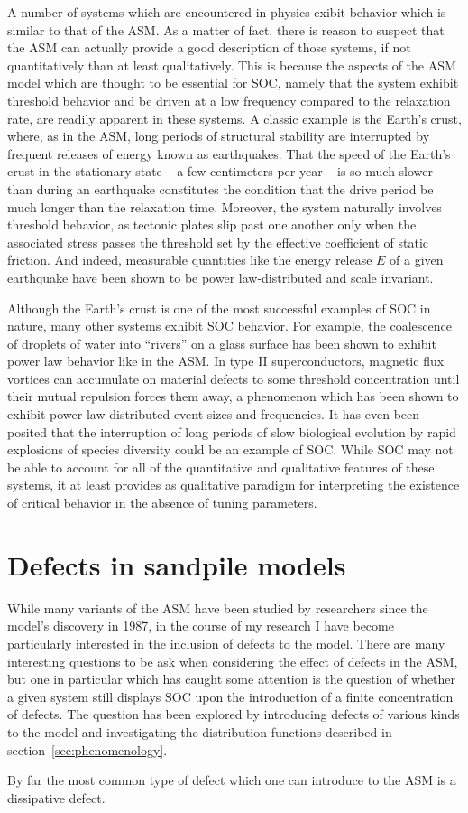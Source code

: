 \documentclass[aps,prb,reprint,superscriptaddress]{revtex4-2}
\begin{document}
A number of systems which are encountered in physics exibit behavior which is similar to that of the ASM. As a matter of fact, there is reason to suspect that the ASM can actually provide a good description of those systems, if not quantitatively than at least qualitatively. This is because the aspects of the ASM model which are thought to be essential for SOC, namely that the system exhibit threshold behavior and be driven at a low frequency compared to the relaxation rate, are readily apparent in these systems. A classic example is the Earth's crust, where, as in the ASM, long periods of structural stability are interrupted by frequent releases of energy known as earthquakes. That the speed of the Earth's crust in the stationary state -- a few centimeters per year -- is so much slower than during an earthquake constitutes the condition that the drive period be much longer than the relaxation time. Moreover, the system naturally involves threshold behavior, as tectonic plates slip past one another only when the associated stress passes the threshold set by the effective coefficient of static friction. And indeed, measurable quantities like the energy release $E$ of a given earthquake have been shown to be power law-distributed and scale invariant.

Although the Earth's crust is one of the most successful examples of SOC in nature, many other systems exhibit SOC behavior. For example, the coalescence of droplets of water into ``rivers'' on a glass surface has been shown to exhibit power law behavior like in the ASM. In type II superconductors, magnetic flux vortices can accumulate on material defects to some threshold concentration until their mutual repulsion forces them away, a phenomenon which has been shown to exhibit power law-distributed event sizes and frequencies. It has even been posited that the interruption of long periods of slow biological evolution by rapid explosions of species diversity could be an example of SOC. While SOC may not be able to account for all of the quantitative and qualitative features of these systems, it at least provides as qualitative paradigm for interpreting the existence of critical behavior in the absence of tuning parameters.

\section{Defects in sandpile models}

While many variants of the ASM have been studied by researchers since the model's discovery in 1987, in the course of my research I have become particularly interested in the inclusion of defects to the model. There are many interesting questions to be ask when considering the effect of defects in the ASM, but one in particular which has caught some attention is the question of whether a given system still displays SOC upon the introduction of a finite concentration of defects. The question has been explored by introducing defects of various kinds to the model and investigating the distribution functions described in section~\ref{sec:phenomenology}.

By far the most common type of defect which one can introduce to the ASM is a dissipative defect. 










\end{document}
